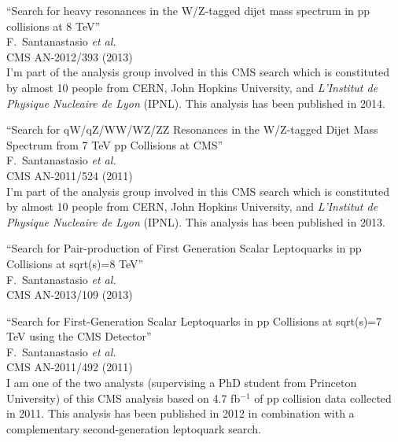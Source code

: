 \documentclass[10pt, a4paper]{article}
\begin{document}
\begin{thebibliography}{599}
``Search for heavy resonances in the W/Z-tagged dijet mass spectrum in pp collisions at 8 TeV''
  \\{}F.~Santanastasio {\it et al.}
  \\{}CMS AN-2012/393 (2013)
  \\ I'm part of the analysis group involved in this CMS search which is constituted by almost 10 people from CERN, John Hopkins University, and \textit{L'Institut de Physique Nucleaire de Lyon} (IPNL). This analysis has been published in 2014.

``Search for qW/qZ/WW/WZ/ZZ Resonances in the W/Z-tagged Dijet Mass Spectrum from 7 TeV pp Collisions at CMS''
  \\{}F.~Santanastasio {\it et al.}
  \\{}CMS AN-2011/524 (2011)
  \\ I'm part of the analysis group involved in this CMS search which is constituted by almost 10 people from CERN, John Hopkins University, and \textit{L'Institut de Physique Nucleaire de Lyon} (IPNL). This analysis has been published in 2013.


``Search for Pair-production of First Generation Scalar Leptoquarks in pp Collisions at sqrt(s)=8 TeV''
  \\{}F.~Santanastasio {\it et al.}
  \\{}CMS AN-2013/109 (2013)

``Search for First-Generation Scalar Leptoquarks in pp Collisions at sqrt(s)=7 TeV using the CMS Detector''
  \\{}F.~Santanastasio {\it et al.}
  \\{}CMS AN-2011/492 (2011)
  \\ I am one of the two analysts (supervising a PhD student from Princeton University) of this CMS analysis based on 4.7 fb$^{-1}$ of pp collision data collected in 2011. 
This analysis has been published in 2012 in combination with a complementary second-generation leptoquark search.


\end{thebibliography}
\end{document}
